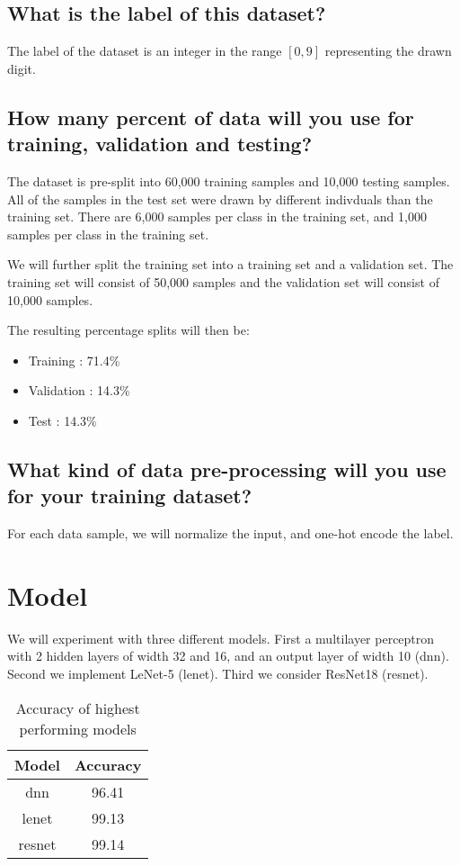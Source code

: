 \documentclass{article}
\begin{document}
\subsection{What is the label of this dataset?}
The label of the dataset is an integer in the range $[0,9]$ representing the drawn 
digit.

\subsection{How many percent of data will you use for training, validation and testing?}
The dataset is pre-split into 60,000 training samples and 10,000 testing samples. All 
of the samples in the test set were drawn by different indivduals than the training 
set. There are 6,000 samples per class in the training set, and 1,000 samples per 
class in the training set.

We will further split the training set into a training set and a validation set.
The training set will consist of 50,000 samples and the validation set will consist
of 10,000 samples.

The resulting percentage splits will then be:
\begin{itemize}
    \item Training : 71.4\%
    \item Validation : 14.3\%
    \item Test : 14.3\%
\end{itemize}


\subsection{What kind of data pre-processing will you use for your training dataset?}
For each data sample, we will normalize the input, and one-hot encode the label.


\section{Model}
We will experiment with three different models. First a multilayer perceptron with 2 hidden
layers of width 32 and 16, and an output layer of width 10 (dnn). Second we implement
LeNet-5 (lenet). Third we consider ResNet18 (resnet).

\begin{table}[h]
\begin{center}
\begin{tabular}{c|c}
    Model & Accuracy \\
    \hline
    dnn & 96.41 \\
    lenet & 99.13 \\
    resnet & 99.14
\end{tabular}
\end{center}
\caption{Accuracy of highest performing models}
\label{table:evaluation_matrix}
\end{table}
\end{document}
